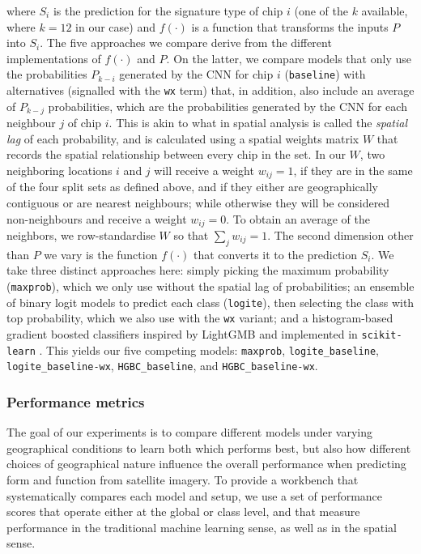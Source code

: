 \documentclass[]{interact}
\theoremstyle{plain}%
\theoremstyle{definition}
\theoremstyle{remark}
\begin{document}
where $S_i$ is the prediction for the signature type of chip $i$ (one of the $k$ available, where
$k=12$ in our case) and $f(\cdot)$ is a function that
transforms the inputs $P$ into $S_i$. The five
approaches we compare derive from the different implementations of $f(\cdot)$
and $P$. On the latter, we compare models that only use the probabilities
$P_{k-i}$ generated by the CNN for chip $i$ (\texttt{baseline}) with alternatives
(signalled with the \texttt{wx} term) that, in addition,
also include an average of $P_{k-j}$ probabilities, which are the
probabilities generated by the CNN for each neighbour $j$ of chip $i$. This is
akin to what in spatial analysis is called the \textit{spatial lag} of each
probability, and is calculated using a spatial weights matrix $W$ that records
the spatial relationship between every chip in the set. In our $W$, two
neighboring locations $i$ and $j$ will receive a weight $w_{ij}=1$,
if they are in the same of the four split sets as defined above, and if they
either are geographically contiguous or are nearest neighbours; while otherwise
they will be considered non-neighbours and receive a weight $w_{ij}=0$. To obtain
an average of the neighbors, we row-standardise $W$ so that $\sum_j w_{ij} =
1$. The second dimension other than $P$ we vary is the function $f(\cdot)$ that converts
it to the prediction $S_i$. We take three distinct approaches here: simply
picking the maximum probability (\texttt{maxprob}), which we only use without the spatial lag of
probabilities; an ensemble of binary logit models to predict each class
(\texttt{logite}), then selecting the class with top probability, which we
also use with the \texttt{wx} variant; and a histogram-based gradient boosted
classifiers inspired by LightGMB \citep{ke2017lightgbm} and implemented in
\texttt{scikit-learn} \citep{pedregosa2011scikit}. This yields our five
competing models:
\texttt{maxprob}, \texttt{logite\_baseline}, \texttt{logite\_baseline-wx},
\texttt{HGBC\_baseline}, and \texttt{HGBC\_baseline-wx}.

\subsubsection{Performance metrics}

The goal of our experiments is to compare different models under varying
geographical conditions to learn both which performs best, but also how
different choices of geographical nature influence the overall performance
when predicting form and function from satellite imagery.
To provide a workbench that systematically compares each model and setup, we
use a set of performance scores that operate either at the global or class level,
and that measure performance in the traditional machine learning sense, as
well as in the spatial sense.
\end{document}
